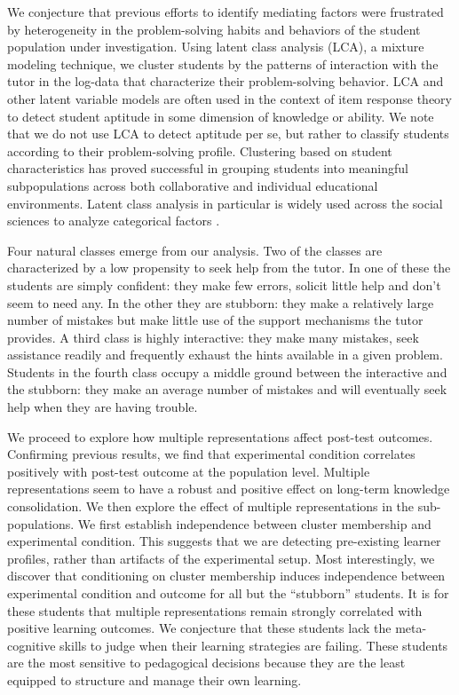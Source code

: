 \documentclass{edm_template}
\begin{document}
We conjecture that previous efforts to identify mediating factors were frustrated by heterogeneity in the problem-solving habits and behaviors of the student population under investigation. Using latent class analysis (LCA), a mixture modeling technique, we cluster students by the patterns of interaction with the tutor in the log-data that characterize their problem-solving behavior. LCA and other latent variable models  are often used in the context of item response theory \cite{Linden1997, Wu2011} to detect student aptitude in some dimension of knowledge or ability. We note that we do not use LCA to detect aptitude per se, but rather to classify students according to their problem-solving profile. Clustering based on student characteristics has proved successful in grouping students into meaningful subpopulations across both collaborative \cite{Perera2009} and individual \cite{Merceron2005} educational environments. Latent class analysis in particular is widely used across the social sciences to analyze categorical factors \cite{Collins2009,Hagenaars2002}.

Four natural classes emerge from our analysis. Two of the classes are characterized by a low propensity to seek help from the tutor. In one of these the students are simply confident: they make few errors, solicit little help and don't seem to need any. In the other they are stubborn: they make a relatively large number of mistakes but make little use of the support mechanisms the tutor provides. A third class is highly interactive: they make many mistakes, seek assistance readily and frequently exhaust the hints available in a given problem. Students in the fourth class occupy a middle ground between the interactive and the stubborn: they make an average number of mistakes and will eventually seek help when they are having trouble.

We proceed to explore how multiple representations affect post-test outcomes. Confirming previous results, we find that experimental condition correlates positively with post-test outcome at the population level. Multiple representations seem to have a robust and positive effect on long-term knowledge consolidation. We then explore the effect of multiple representations in the sub-populations. We first establish independence between cluster membership and experimental condition. This suggests that we are detecting pre-existing learner profiles, rather than artifacts of the experimental setup. Most interestingly, we discover that conditioning on cluster membership induces independence between experimental condition and outcome for all but the ``stubborn'' students. It is for these students that multiple representations remain strongly correlated with positive learning outcomes. We conjecture that these students lack the meta-cognitive skills to judge when their learning strategies are failing. These students are the most sensitive to pedagogical decisions because they are the least equipped to structure and manage their own learning. 
\end{document}

